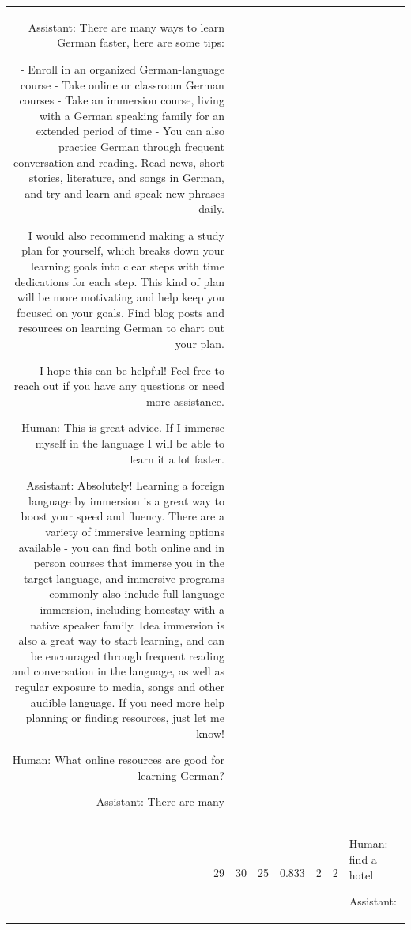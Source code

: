 \begin{tabular}{rrrrrrl}
Assistant: There are many ways to learn German faster, here are some tips:

- Enroll in an organized German-language course
- Take online or classroom German courses
- Take an immersion course, living with a German speaking family for an extended period of time
- You can also practice German through frequent conversation and reading.  Read news, short stories, literature, and songs in German, and try and learn and speak new phrases daily.  

I would also recommend making a study plan for yourself, which breaks down your learning goals into clear steps with time dedications for each step.  This kind of plan will be more motivating and help keep you focused on your goals.  Find blog posts and resources on learning German to chart out your plan.  

I hope this can be helpful!  Feel free to reach out if you have any questions or need more assistance.

Human: This is great advice. If I immerse myself in the language I will be able to learn it a lot faster.

Assistant: Absolutely!  Learning a foreign language by immersion is a great way to boost your speed and fluency.  There are a variety of immersive learning options available - you can find both online and in person courses that immerse you in the target language, and immersive programs commonly also include full language immersion, including homestay with a native speaker family.  Idea immersion is also a great way to start learning, and can be encouraged through frequent reading and conversation in the language, as well as regular exposure to media, songs and other audible language.  If you need more help planning or finding resources, just let me know!

Human: What online resources are good for learning German?

Assistant: There are many  \\
29 & 30 & 25 & 0.833 & 2 & 2 & 

Human: find a hotel

Assistant:  \\
\bottomrule
\end{tabular}
